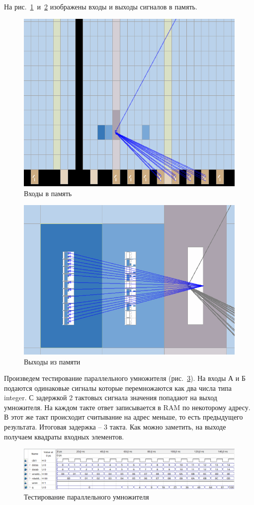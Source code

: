 \documentclass[a4paper,14pt]{article}
\begin{document}
На рис.~\ref{fig:z1_chip_in}~и~\ref{fig:z1_chip_out} изображены входы и выходы сигналов в память.

\begin{figure}[H]
	\centering
	\includegraphics[width=0.5\linewidth]{image/z1_chip_in}
	\caption{Входы в память}
	\label{fig:z1_chip_in}
\end{figure}

\begin{figure}[H]
	\centering
	\includegraphics[width=0.5\linewidth]{image/z1_chip_out}
	\caption{Выходы из памяти}
	\label{fig:z1_chip_out}
\end{figure}

Произведем тестирование параллельного умножителя (рис.~\ref{fig:z1_wave}).
На входы А и Б подаются одинаковые сигналы которые перемножаются как два числа типа integer.
С задержкой 2 тактовых сигнала значения попадают на выход умножителя.
На каждом такте ответ записывается в RAM по некоторому адресу.
В этот же такт происходит считывание на адрес меньше, то есть предыдущего результата.
Итоговая задержка -- 3 такта.
Как можно заметить, на выходе получаем квадраты входных элементов.

\begin{figure}[H]
	\centering
	\includegraphics[width=\linewidth]{image/z1_wave}
	\caption{Тестирование параллельного умножителя}
	\label{fig:z1_wave}
\end{figure}
\end{document}
